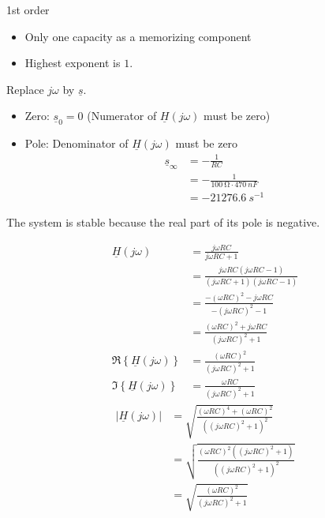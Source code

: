 \begin{solution}
	\begin{tasks}
		\task
		1st order
		\begin{itemize}
			\item Only one capacity as a memorizing component
			\item Highest exponent is $1$.
		\end{itemize}
	
		\task
		Replace $j \omega$ by $\underline{s}$.
		\begin{itemize}
			\item Zero: $\underline{s}_0 = 0$ (Numerator of $\underline{H}\left(j \omega\right)$ must be zero)
			\item Pole: Denominator of $\underline{H}\left(j \omega\right)$ must be zero
			\begin{equation*}
				\begin{split}
					\underline{s}_{\infty} &= -\frac{1}{RC} \\
					 &= -\frac{1}{\SI{100}{\ohm} \cdot \SI{470}{nF}} \\
					 &= \SI{-21276.6}{s^{-1}}
				\end{split}
			\end{equation*}
		\end{itemize}
		The system is stable because the real part of its pole is negative.
		
		\task
		\begin{equation*}
			\begin{split}
				\underline{H}\left(j \omega\right) &= \frac{j \omega RC}{j \omega RC + 1} \\
				 &= \frac{j \omega RC \left(j \omega RC - 1\right)}{\left(j \omega RC + 1\right)\left(j \omega RC - 1\right)} \\
				 &= \frac{-\left(\omega RC\right)^2 - j \omega RC}{- \left(j \omega RC\right)^2 - 1} \\
				 &= \frac{\left(\omega RC\right)^2 + j \omega RC}{\left(j \omega RC\right)^2 + 1} \\
				\Re\left\{\underline{H}\left(j \omega\right)\right\} &= \frac{\left(\omega RC\right)^2}{\left(j \omega RC\right)^2 + 1} \\
				\Im\left\{\underline{H}\left(j \omega\right)\right\} &= \frac{\omega RC}{\left(j \omega RC\right)^2 + 1}
			\end{split}
		\end{equation*}
		\begin{equation*}
			\begin{split}
				\left|\underline{H}\left(j \omega\right)\right| &= \sqrt{\frac{\left(\omega RC\right)^4 + \left(\omega RC\right)^2}{\left(\left(j \omega RC\right)^2 + 1\right)^2}} \\
				 &= \sqrt{\frac{\left(\omega RC\right)^2 \left(\left(j \omega RC\right)^2 + 1\right)}{\left(\left(j \omega RC\right)^2 + 1\right)^2}} \\
				 &= \sqrt{\frac{\left(\omega RC\right)^2}{\left(j \omega RC\right)^2 + 1}}
			\end{split}
		\end{equation*}
		

\end{tasks}
\end{solution}
